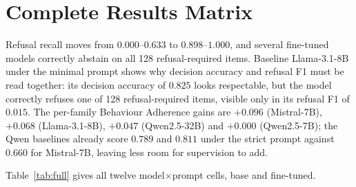 \section{Complete Results Matrix}
\label{app:full}

Refusal recall moves from $0.000$--$0.633$ to $0.898$--$1.000$, and several
fine-tuned models correctly abstain on all 128 refusal-required items. Baseline
Llama-3.1-8B under the minimal prompt shows why decision accuracy and refusal F1
must be read together: its decision accuracy of $0.825$ looks respectable, but
the model correctly refuses one of 128 refusal-required items, visible only in
its refusal F1 of $0.015$. The per-family Behaviour Adherence gains are $+0.096$
(Mistral-7B), $+0.068$ (Llama-3.1-8B), $+0.047$ (Qwen2.5-32B) and $+0.000$
(Qwen2.5-7B); the Qwen baselines already score $0.789$ and $0.811$ under the
strict prompt against $0.660$ for Mistral-7B, leaving less room for supervision
to add.

Table~\ref{tab:full} gives all twelve model$\times$prompt cells, base and fine-tuned.


